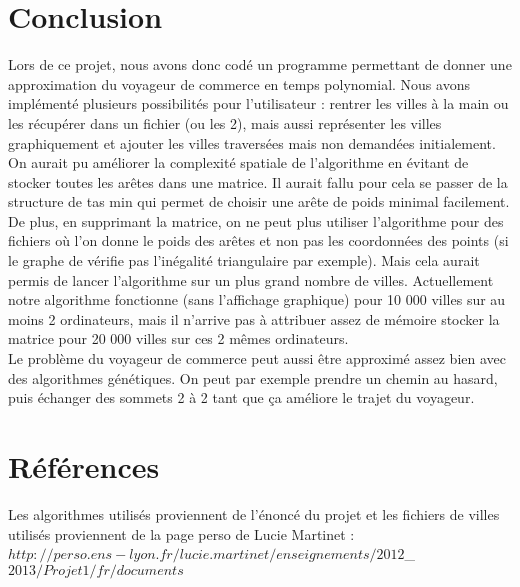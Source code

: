 \documentclass[a4paper,11pt]{article}
\begin{document}
\section{Conclusion} %

Lors de ce projet, nous avons donc codé un programme permettant de donner une approximation du voyageur de commerce en temps polynomial. Nous avons implémenté plusieurs possibilités pour l'utilisateur : rentrer les villes à la main ou les récupérer dans un fichier (ou les 2), mais aussi représenter les villes graphiquement et ajouter les villes traversées mais non demandées initialement.\\
On aurait pu améliorer la complexité spatiale de l'algorithme en évitant de stocker toutes les arêtes dans une matrice. Il aurait fallu pour cela se passer de la structure de tas min qui permet de choisir une arête de poids minimal facilement. De plus, en supprimant la matrice, on ne peut plus utiliser l'algorithme pour des fichiers où l'on donne le poids des arêtes et non pas les coordonnées des points (si le graphe de vérifie pas l'inégalité triangulaire par exemple). Mais cela aurait permis de lancer l'algorithme sur un plus grand nombre de villes. Actuellement notre algorithme fonctionne (sans l'affichage graphique) pour 10 000 villes sur au moins 2 ordinateurs, mais il n'arrive pas à attribuer assez de mémoire stocker la matrice pour 20 000 villes sur ces 2 mêmes ordinateurs.\\
Le problème du voyageur de commerce peut aussi être approximé assez bien avec des algorithmes génétiques. On peut par exemple prendre un chemin au hasard, puis échanger des sommets 2 à 2 tant que ça améliore le trajet du voyageur.


\section{Références}

Les algorithmes utilisés proviennent de l'énoncé du projet et les fichiers de villes utilisés proviennent de la page perso de Lucie Martinet : \\
$http://perso.ens-lyon.fr/lucie.martinet/enseignements/2012$\_$2013/Projet1/fr/documents$
\end{document}
